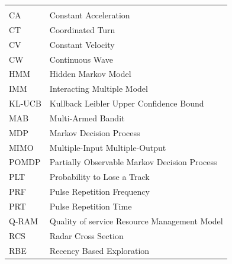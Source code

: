 \documentclass[english, 12pt, a4paper, elec, utf8, a-1b, online]{aaltothesis}
\begin{document}
\begin{tabular}{ll}
&\\
CA & Constant Acceleration \\
CT & Coordinated Turn \\
CV & Constant Velocity \\
CW & Continuous Wave \\
HMM & Hidden Markov Model \\
IMM & Interacting Multiple Model \\
KL-UCB & Kullback Leibler Upper Confidence Bound \\
MAB  & Multi-Armed Bandit \\
MDP & Markov Decision Process \\
MIMO & Multiple-Input Multiple-Output \\
POMDP & Partially Observable Markov Decision Process \\
PLT & Probability to Lose a Track \\
PRF  &  Pulse Repetition Frequency \\
PRT  & Pulse Repetition Time \\
Q-RAM & Quality of service Resource Management Model \\
RCS & Radar Cross Section \\
RBE  & Recency Based Exploration \\

\end{tabular}
\end{document}
